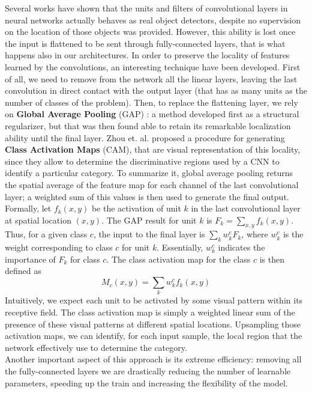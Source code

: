 \documentclass[../main.tex]{subfiles}
\begin{document}
Several works have shown that the units and filters of convolutional layers in neural networks actually behaves as real object detectors, despite no supervision on the location of those objects was provided. However, this ability is lost once the input is flattened to be sent through fully-connected layers, that is what happens also in our architectures. In order to preserve the locality of features learned by the convolutions, an interesting technique have been developed. First of all, we need to remove from the network all the linear layers, leaving the last convolution in direct contact with the output layer (that has as many units as the number of classes of the problem). Then, to replace the flattening layer, we rely on \textbf{Global Average Pooling} (GAP) \cite{network_in_network}: a method developed first as a structural regularizer, but that was then found able to retain its remarkable localization
ability until the final layer. Zhou et. al. \cite{class_activation_maps} proposed a procedure for generating \textbf{Class Activation Maps} (CAM), that are visual representation of this locality, since they allow to determine the discriminative regions used by a CNN to identify a particular category. To summarize it, global average pooling returns the spatial average of the feature map for each channel of the last convolutional layer; a weighted sum of this values is then used to generate the final output.\\
Formally, let $f_k(x,y)$ be the activation of unit $k$ in the last convolutional layer at spatial location $(x,y)$. The GAP result for unit $k$ is $F_k = \sum_{x,y}f_k(x,y)$. Thus, for a given class $c$, the input to the final layer is $\sum_k w^c_kF_k	$, where $w^c_k$ is the weight corresponding to class $c$ for unit $k$. Essentially, $w^c_k$ indicates the importance of $F_k$ for class $c$. The class activation map for the class $c$ is then defined as 
\[ M_c(x,y) = \sum_k w^c_k f_k(x,y) \]
Intuitively, we expect each
unit to be activated by some visual pattern within its receptive field. The class activation map is simply a weighted linear sum of the presence of these visual patterns at different spatial locations. Upsampling those activation maps, we can identify, for each input sample, the local region that the network effectively use to determine the category.\\
Another important aspect of this approach is its extreme efficiency: removing all the fully-connected layers we are drastically reducing the number of learnable parameters, speeding up the train and increasing the flexibility of the model.\\
\end{document}
